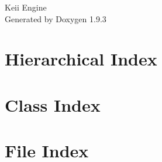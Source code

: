 \documentclass[twoside]{book}
\newcommand{\+}{\discretionary{\mbox{\scriptsize$\hookleftarrow$}}{}{}}
\newcommand{\clearemptydoublepage}{%
    \newpage{\pagestyle{empty}\cleardoublepage}%
  }
\begin{document}
  \raggedbottom
    \hypersetup{pageanchor=false,
                bookmarksnumbered=true,
                pdfencoding=unicode
               }
  \begin{titlepage}
  \vspace*{7cm}
  \begin{center}%
  {\Large Keii Engine}\\
  \vspace*{1cm}
  {\large Generated by Doxygen 1.9.3}\\
  \end{center}
  \end{titlepage}
  \clearemptydoublepage
  \tableofcontents
  \clearemptydoublepage
  \hypersetup{pageanchor=true}
\chapter{Hierarchical Index}

\chapter{Class Index}

\chapter{File Index}

\end{document}
